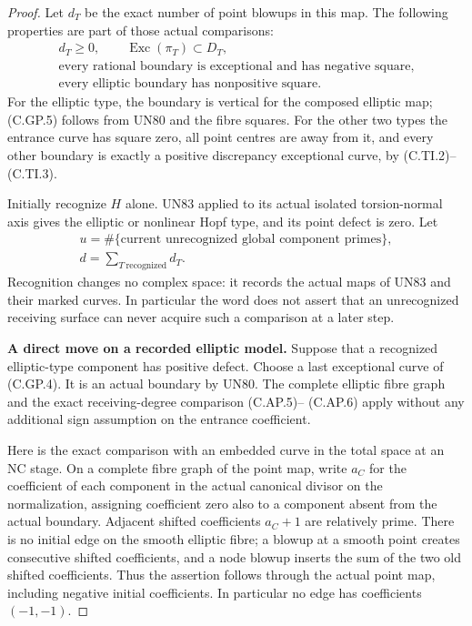\begin{proof}
Let \(d_T\) be the exact number of point blowups
in this map. The following properties are part
of those actual comparisons:
\[
\begin{gathered}
 d_T\ge0,\qquad
 \operatorname{Exc}(\pi_T)\subset D_T,\\
 \text{every rational boundary is exceptional
 and has negative square},\\
 \text{every elliptic boundary has nonpositive square}.
\end{gathered}
 \tag{C.GP.5}
\]
For the elliptic type, the boundary is vertical
for the composed elliptic map; (C.GP.5) follows
from UN80 and the fibre squares. For the other
two types the entrance curve has square zero,
all point centres are away from it, and every
other boundary is exactly a positive discrepancy
exceptional curve, by (C.TI.2)--(C.TI.3).

Initially recognize \(H\) alone. UN83 applied
to its actual isolated torsion-normal axis gives
the elliptic or nonlinear Hopf type, and its
point defect is zero. Let
\[
\begin{gathered}
 u=\#\{\text{current unrecognized global component primes}\},
 \\
 d=\sum_{T\ \mathrm{recognized}}d_T.
\end{gathered}
 \tag{C.GP.6}
\]
Recognition changes no complex space: it records
the actual maps of UN83 and their marked curves.
In particular the word does not assert that an
unrecognized receiving surface can never acquire
such a comparison at a later step.

\par\medskip\noindent\textbf{A direct move on a recorded elliptic model.}
Suppose that a recognized elliptic-type component
has positive defect. Choose a last exceptional
curve of (C.GP.4). It is an actual boundary by
UN80. The complete elliptic fibre graph and the
exact receiving-degree comparison (C.AP.5)--
(C.AP.6) apply without any additional sign
assumption on the entrance coefficient.

Here is the exact comparison with an embedded
curve in the total space at an NC stage. On a
complete fibre graph of the point map, write
\(a_C\) for the coefficient of each component
in the actual canonical divisor on the
normalization, assigning coefficient zero
also to a component absent from the actual
boundary. Adjacent shifted coefficients
\(a_C+1\) are relatively prime. There is no
initial edge on the smooth elliptic fibre;
a blowup at a smooth point creates consecutive
shifted coefficients, and a node blowup inserts
the sum of the two old shifted coefficients.
Thus the assertion follows through the actual
point map, including negative initial coefficients.
In particular no edge has coefficients
\((-1,-1)\).


\end{proof}
